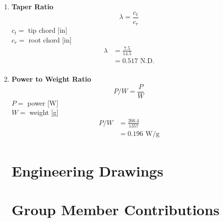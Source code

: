 \begin{enumerate}[wide,label=\textbf{\arabic*}., labelindent=0pt]
    \item \textbf{Taper Ratio}
        \[\lambda = \frac{c_t}{c_r}\]
        $ c_t =$ tip chord [in]\\
        $ c_r =$ root chord [in]\\
        
        \begin{align*}
            \lambda &= \frac{7.5}{14.5}\\
            &= 0.517 \text{ N.D.}\\
        \end{align*}
        
    \item \textbf{Power to Weight Ratio}
        \[P/W = \frac{P}{W}\]
        $ P =$ power [W]\\
        $ W =$ weight [g]\\
        
        \begin{align*}
            P/W &= \frac{266.4}{1357}\\
            &= 0.196 \text{ W/g}\\
        \end{align*}
 
\section{Engineering Drawings} \label{apx:eng_drawings}
    
    
    
    
    
    
    
    
    
    
    


\section{Group Member Contributions} \label{apx:contributions}


\end{enumerate}
